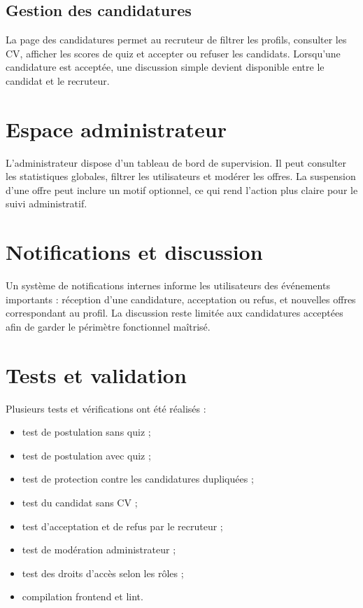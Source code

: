 \subsection{Gestion des candidatures}

\noindent
La page des candidatures permet au recruteur de filtrer les profils, consulter les CV, afficher les scores de quiz et accepter ou refuser les candidats. Lorsqu'une candidature est acceptée, une discussion simple devient disponible entre le candidat et le recruteur.


\section{Espace administrateur}

\noindent
L'administrateur dispose d'un tableau de bord de supervision. Il peut consulter les statistiques globales, filtrer les utilisateurs et modérer les offres. La suspension d'une offre peut inclure un motif optionnel, ce qui rend l'action plus claire pour le suivi administratif.


\section{Notifications et discussion}

\noindent
Un système de notifications internes informe les utilisateurs des événements importants : réception d'une candidature, acceptation ou refus, et nouvelles offres correspondant au profil. La discussion reste limitée aux candidatures acceptées afin de garder le périmètre fonctionnel maîtrisé.

\section{Tests et validation}

\noindent
Plusieurs tests et vérifications ont été réalisés :

\begin{itemize}
    \item test de postulation sans quiz ;
    \item test de postulation avec quiz ;
    \item test de protection contre les candidatures dupliquées ;
    \item test du candidat sans CV ;
    \item test d'acceptation et de refus par le recruteur ;
    \item test de modération administrateur ;
    \item test des droits d'accès selon les rôles ;
    \item compilation frontend et lint.
\end{itemize}

